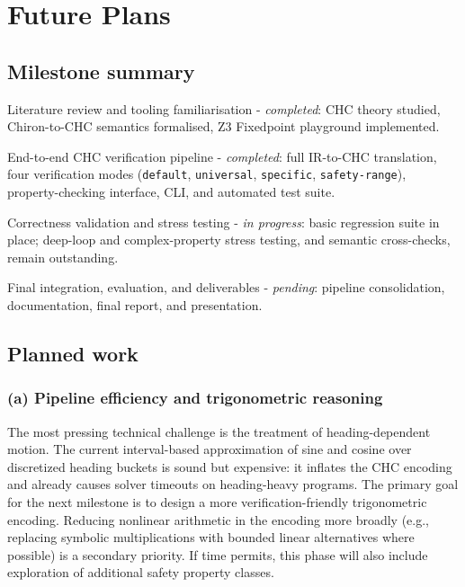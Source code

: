 \section*{Future Plans}

\subsection*{Milestone summary}

\begin{description}[leftmargin=2.2cm]
  \item[Milestone 1] Literature review and tooling familiarisation - \textit{completed}: CHC theory studied, Chiron-to-CHC semantics formalised, Z3 Fixedpoint playground implemented.
  \item[Milestone 2] End-to-end CHC verification pipeline - \textit{completed}: full IR-to-CHC translation, four verification modes (\texttt{default}, \texttt{universal}, \texttt{specific}, \texttt{safety-range}), property-checking interface, CLI, and automated test suite.
  \item[Milestone 3] Correctness validation and stress testing - \textit{in progress}: basic regression suite in place; deep-loop and complex-property stress testing, and semantic cross-checks, remain outstanding.
  \item[Milestone 4] Final integration, evaluation, and deliverables - \textit{pending}: pipeline consolidation, documentation, final report, and presentation.
\end{description}

\subsection*{Planned work}

\subsubsection*{(a) Pipeline efficiency and trigonometric reasoning}
The most pressing technical challenge is the treatment of heading-dependent motion. The current interval-based approximation of sine and cosine over discretized heading buckets is sound but expensive: it inflates the CHC encoding and already causes solver timeouts on heading-heavy programs. The primary goal for the next milestone is to design a more verification-friendly trigonometric encoding. Reducing nonlinear arithmetic in the encoding more broadly (e.g., replacing symbolic multiplications with bounded linear alternatives where possible) is a secondary priority. If time permits, this phase will also include exploration of additional safety property classes.

